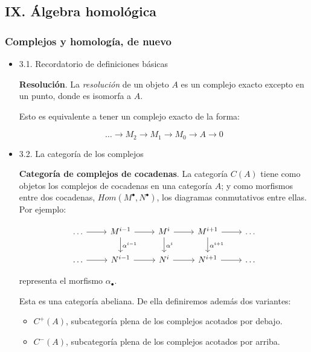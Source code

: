 \documentclass[11pt]{article}
\begin{document}
\subsection*{IX. Álgebra homológica}
\label{sec-4-5}
\subsubsection*{Complejos y homología, de nuevo}
\label{sec-4-5-1}
\begin{itemize}
\item 3.1. Recordatorio de definiciones básicas
\label{sec-4-5-1-1}
\begin{definition}
\textbf{Resolución}. La \emph{resolución} de un objeto $A$ es un complejo
exacto excepto en un punto, donde es isomorfa a $A$.
\end{definition}

Esto es equivalente a tener un complejo exacto de la forma:

\[ \dots \overset{}\longrightarrow 
 M_2 \overset{}\longrightarrow 
 M_1 \overset{}\longrightarrow 
 M_0 \overset{}\longrightarrow 
 A \longrightarrow
 0\]

\item 3.2. La categoría de los complejos
\label{sec-4-5-1-2}
\begin{definition}
\textbf{Categoría de complejos de cocadenas}. La categoría $C(A)$ tiene como objetos
los complejos de cocadenas en una categoría $A$; y como morfismos entre dos 
cocadenas,   $Hom(M^\bullet,N^\bullet)$, los diagramas conmutativos entre ellas. Por ejemplo:

\[ \begin{tikzcd}
 \dots \rar & M^{i-1} \rar\dar{\alpha^{i-1}} & M^{i} \rar\dar{\alpha^{i}} &  M^{i+1} \rar\dar{\alpha^{i+1}} & \dots \\
 \dots \rar & N^{i-1} \rar & N^{i} \rar & N^{i+1} \rar & \dots
 \end{tikzcd} \]

representa el morfismo $\alpha_\bullet$.
\end{definition}

Esta es una categoría abeliana. De ella definiremos además dos variantes:

\begin{itemize}
\item $C^+(A)$, subcategoría plena de los complejos acotados por debajo.
\item $C^-(A)$, subcategoría plena de los complejos acotados por arriba.
\end{itemize}
\end{itemize}
\end{document}
